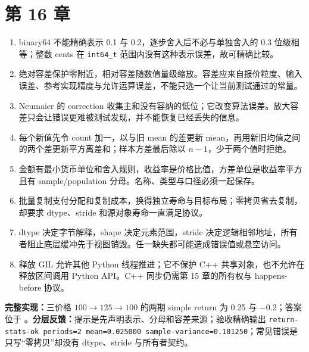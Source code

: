 \section{第 16 章}
\begin{enumerate}
  \item binary64 不能精确表示 0.1 与 0.2，逐步舍入后不必与单独舍入的 0.3 位级相等；整数 cents 在 \texttt{int64\_t} 范围内没有这种表示误差，故可精确比较。
  \item 绝对容差保护零附近，相对容差随数值量级缩放。容差应来自报价粒度、输入误差、参考实现精度与允许运算误差，不能只选一个让当前测试通过的常量。
  \item Neumaier 的 correction 收集主和没有容纳的低位；它改变算法误差。放大容差只会让错误更难被测试发现，并不能恢复已经丢失的信息。
  \item 每个新值先令 count 加一，以与旧 mean 的差更新 mean，再用新旧均值之间的两个差更新平方离差和；样本方差最后除以 $n-1$，少于两个值时拒绝。
  \item 金额有最小货币单位和舍入规则，收益率是价格比值，方差单位是收益率平方且有 sample/population 分母。名称、类型与口径必须一起保存。
  \item 批量复制支付分配和复制成本，换得独立寿命与目标布局；零拷贝省去复制，却要求 dtype、stride 和源对象寿命一直满足协议。
  \item dtype 决定字节解释，shape 决定元素范围，stride 决定逻辑相邻地址，所有者阻止底层缓冲先于视图销毁。任一缺失都可能造成错误值或悬空访问。
  \item 释放 GIL 允许其他 Python 线程推进；它不保护 C++ 共享对象，也不允许在释放区间调用 Python API。C++ 同步仍需第 15 章的所有权与 happens-before 协议。
\end{enumerate}

\noindent\textbf{完整实现：}三价格 $100\rightarrow125\rightarrow100$ 的两期 simple return 为 0.25 与 $-0.2$；答案位于 。\textbf{分层反馈：}提示是先声明表示、分母和容差来源；验收精确输出 \texttt{return-stats-ok periods=2 mean=0.025000 sample-variance=0.101250}；常见错误是只写“零拷贝”却没有 dtype、stride 与所有者契约。

